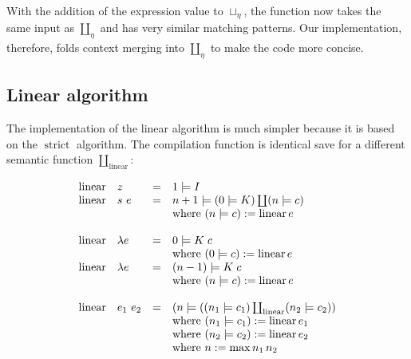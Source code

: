 \documentclass[conference]{IEEEtran}
\DeclareMathOperator{\strict}{strict}
\DeclareMathOperator{\linear}{linear}
\begin{document}
With the addition of the expression value to $\sqcup_\eta$, the function now takes the same input as $\coprod_\eta$ and has very similar matching patterns.
Our implementation, therefore, folds context merging into $\coprod_\eta$ to make the code more concise.

\subsection{Linear algorithm}
The implementation of the linear algorithm is much simpler because it is based on the $\strict$ algorithm.
The compilation function is identical save for a different semantic function $\coprod_{\text{linear}}$:

\begin{equation*}
    \begin{array}{l l l l}
        \linear & z         & = & 1 \models I                                                              \\
        \linear & s \ e     & = & n+1 \models (0 \models K) \coprod (n \models c)                          \\
                &           &   & \text{where } (n \models c) := \linear e                                 \\
        \\
        \linear & \lambda e & = & 0 \models K \; c                                                         \\
                &           &   & \text{where } (0 \models c) := \linear e                                 \\
        \linear & \lambda e & = & (n-1) \models K \; c                                                     \\
                &           &   & \text{where } (n \models c) := \linear e                                 \\
        \\
        \linear & e_1 \ e_2 & = & (n \models ((n_1 \models c_1) \coprod_{\text{linear}} (n_2 \models c_2)) \\
                &           &   & \text{where } (n_1 \models c_1) := \linear e_1                           \\
                &           &   & \text{where } (n_2 \models c_2) := \linear e_2                           \\
                &           &   & \text{where } n := \max n_1 \, n_2                                       \\
    \end{array}
\end{equation*}
\end{document}
